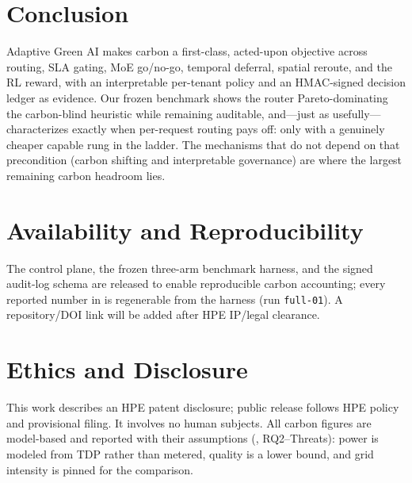 \documentclass[10pt,twocolumn]{article}
\begin{document}
\section{Conclusion}
\label{sec:conclusion}
Adaptive Green AI makes carbon a first-class, acted-upon objective across
routing, SLA gating, MoE go/no-go, temporal deferral, spatial reroute, and the
RL reward, with an interpretable per-tenant policy and an HMAC-signed decision
ledger as evidence. Our frozen benchmark shows the router Pareto-dominating the
carbon-blind heuristic while remaining auditable, and---just as
usefully---characterizes exactly when per-request routing pays off: only with a
genuinely cheaper capable rung in the ladder. The mechanisms that do not depend
on that precondition (carbon shifting and interpretable governance) are where
the largest remaining carbon headroom lies.

\section*{Availability and Reproducibility}
The control plane, the frozen three-arm benchmark harness, and the signed
audit-log schema are released to enable reproducible carbon accounting; every
reported number in  is regenerable from the harness
(run \texttt{full-01}). A repository/DOI link will be added after HPE IP/legal
clearance.

\section*{Ethics and Disclosure}
This work describes an HPE patent disclosure; public release follows HPE policy
and provisional filing. It involves no human subjects. All carbon figures are
model-based and reported with their assumptions (, RQ2--Threats):
power is modeled from TDP rather than metered, quality is a lower bound, and
grid intensity is pinned for the comparison.

\balance


\end{document}
